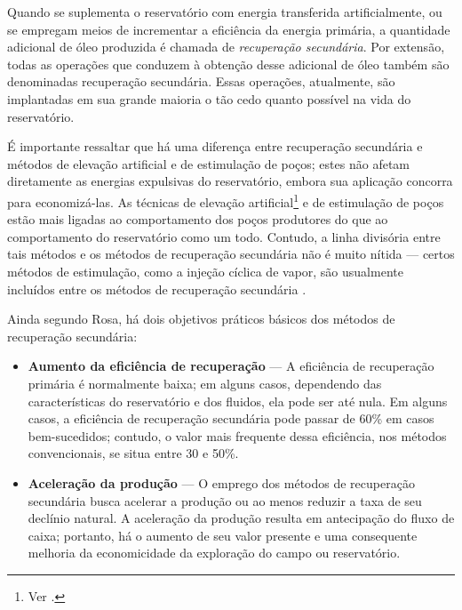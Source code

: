 Quando se suplementa o reservat\'{o}rio com energia transferida artificialmente, ou se empregam meios de incrementar a efici\^{e}ncia da energia prim\'{a}ria, a quantidade adicional de \'{o}leo produzida \'{e} chamada de \textit{recupera\c{c}\~{a}o secund\'{a}ria}. Por extens\~{a}o, todas as opera\c{c}\~{o}es que conduzem \`{a} obten\c{c}\~{a}o desse adicional de \'{o}leo tamb\'{e}m s\~{a}o denominadas recupera\c{c}\~{a}o secund\'{a}ria. Essas opera\c{c}\~{o}es, atualmente, s\~{a}o implantadas em sua grande maioria o t\~{a}o cedo quanto poss\'{i}vel na vida do reservat\'{o}rio.

\'{E} importante ressaltar que h\'{a} uma diferen\c{c}a entre recupera\c{c}\~{a}o secund\'{a}ria e m\'{e}todos de eleva\c{c}\~{a}o artificial e de estimula\c{c}\~{a}o de po\c{c}os; estes n\~{a}o afetam diretamente as energias expulsivas do reservat\'{o}rio, embora sua aplica\c{c}\~{a}o concorra para economiz\'{a}-las. As t\'{e}cnicas de eleva\c{c}\~{a}o artificial\footnote{Ver \cite{engpetro}.} e de estimula\c{c}\~{a}o de po\c{c}os est\~{a}o mais ligadas ao comportamento dos po\c{c}os produtores do que ao comportamento do reservat\'{o}rio como um todo. Contudo, a linha divis\'{o}ria entre tais m\'{e}todos e os m\'{e}todos de recupera\c{c}\~{a}o secund\'{a}ria n\~{a}o \'{e} muito n\'{i}tida --- certos m\'{e}todos de estimula\c{c}\~{a}o, como a inje\c{c}\~{a}o c\'{i}clica de vapor, s\~{a}o usualmente inclu\'{i}dos entre os m\'{e}todos de recupera\c{c}\~{a}o secund\'{a}ria \cite{engres}.

Ainda segundo Rosa, h\'{a} dois objetivos pr\'{a}ticos b\'{a}sicos dos m\'{e}todos de recupera\c{c}\~{a}o secund\'{a}ria:

\begin{itemize}
\item \textbf{Aumento da efici\^{e}ncia de recupera\c{c}\~{a}o} --- A efici\^{e}ncia de recupera\c{c}\~{a}o prim\'{a}ria \'{e} normalmente baixa; em alguns casos, dependendo das caracter\'{i}sticas do reservat\'{o}rio e dos fluidos, ela pode ser at\'{e} nula. Em alguns casos, a efici\^{e}ncia de recupera\c{c}\~{a}o secund\'{a}ria pode passar de 60\% em casos bem-sucedidos; contudo, o valor mais frequente dessa efici\^{e}ncia, nos m\'{e}todos convencionais, se situa entre 30 e 50\%.
\item \textbf{Acelera\c{c}\~{a}o da produ\c{c}\~{a}o} --- O emprego dos m\'{e}todos de recupera\c{c}\~{a}o secund\'{a}ria busca acelerar a produ\c{c}\~{a}o ou ao menos reduzir a taxa de seu decl\'{i}nio natural. A acelera\c{c}\~{a}o da produ\c{c}\~{a}o resulta em antecipa\c{c}\~{a}o do fluxo de caixa; portanto, h\'{a} o aumento de seu valor presente e uma consequente melhoria da economicidade da explora\c{c}\~{a}o do campo ou reservat\'{o}rio.
\end{itemize}


